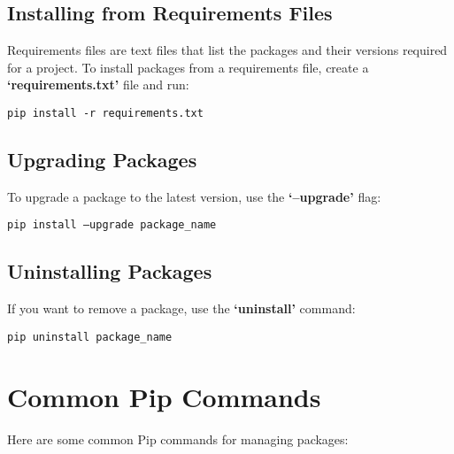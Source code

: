 \documentclass[a4paper, 12pt]{report}
\newcommand{\commandbox}[1]{%
    \begin{tcolorbox}[colback=green!10, colframe=green!50!black, rounded corners]
        #1
    \end{tcolorbox}%
}
\begin{document}
        \subsection{Installing from Requirements Files}
            Requirements files are text files that list the packages and their versions required for a project. To install packages from a requirements file, create a \textbf{`requirements.txt'} file and run:
            \commandbox{\texttt{pip install -r requirements.txt}}
            
        \subsection{Upgrading Packages}
            To upgrade a package to the latest version, use the \textbf{`--upgrade'} flag:
            \commandbox{\texttt{pip install --upgrade package\_name}}
            
        \subsection{Uninstalling Packages}
            If you want to remove a package, use the \textbf{`uninstall'} command:
            \commandbox{\texttt{pip uninstall package\_name}}
    
    \newpage

    
    \section{Common Pip Commands}
        Here are some common Pip commands for managing packages:
\end{document}
